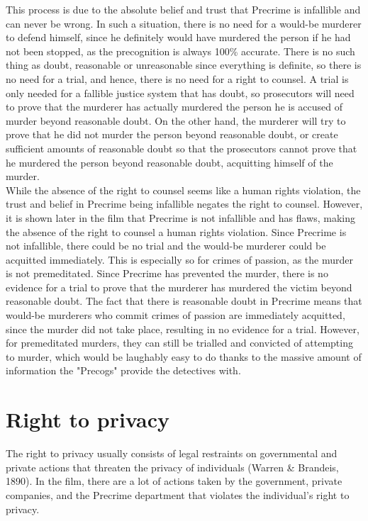 \documentclass[11pt]{article}
\makeatletter
\newcommand{\citeprocitem}[2]{\hyper@linkstart{cite}{citeproc_bib_item_#1}#2\hyper@linkend}
\makeatother
\begin{document}
This process is due to the absolute belief and trust that Precrime
is infallible and can never be wrong. In such a situation, there
is no need for a would-be murderer to defend himself, since he
definitely would have murdered the person if he had not been stopped,
as the precognition is always 100\% accurate. There is no such thing
as doubt, reasonable or unreasonable since everything is definite,
so there is no need for a trial, and hence, there is no need for a right to counsel.
A trial is only needed for a fallible justice system that has doubt,
so prosecutors will need to prove that the murderer has actually murdered
the person he is accused of murder beyond reasonable doubt.
On the other hand, the murderer will try to prove that he did not murder
the person beyond reasonable doubt, or create sufficient amounts of
reasonable doubt so that the prosecutors cannot prove that he murdered
the person beyond reasonable doubt,
acquitting himself of the murder.  \\

While the absence of the right to counsel seems like a human rights
violation, the trust and belief in Precrime being infallible negates the
right to counsel. However, it is shown later in the film that Precrime
is not infallible and has flaws, making the absence of the
right to counsel a human rights violation. Since Precrime is
not infallible, there could be no trial and the would-be murderer
could be acquitted immediately. This is especially so for
crimes of passion, as the murder is not premeditated.
Since Precrime has prevented the murder, there is no evidence
for a trial to prove that the murderer has murdered the victim
beyond reasonable doubt. The fact that there is reasonable doubt in
Precrime means that would-be murderers who commit crimes of passion
are immediately acquitted, since the murder did not take place,
resulting in no evidence for a trial. However, for premeditated murders,
they can still be trialled and convicted of attempting to murder,
which would be laughably easy to do thanks to the massive amount of
information the "Precogs" provide the detectives with.

 \newpage

\section{Right to privacy}
\label{sec:org03e03e9}
The right to privacy usually consists of legal restraints on governmental
and private actions that threaten the privacy of individuals
(\citeprocitem{12}{Warren \& Brandeis, 1890}).
In the film, there are a lot of actions taken by the government, private
companies, and the Precrime department that violates the
individual's right to privacy.
\end{document}
